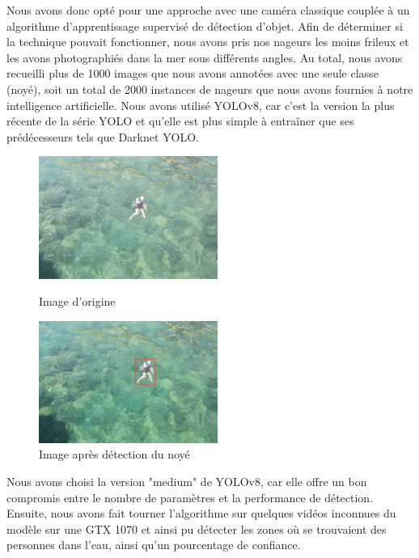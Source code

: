 \documentclass[a4paper,12pt,french]{report}
\begin{document}
Nous avons donc opté pour une approche avec une caméra classique couplée à un algorithme d'apprentissage supervisé de détection d'objet. Afin de déterminer si la technique pouvait fonctionner, nous avons pris nos nageurs les moins frileux et les avons photographiés dans la mer sous différents angles. Au total, nous avons recueilli plus de 1000 images que nous avons annotées avec une seule classe (noyé), soit un total de 2000 instances de nageurs que nous avons fournies à notre intelligence artificielle. Nous avons utilisé YOLOv8, car c'est la version la plus récente de la série YOLO et qu'elle est plus simple à entraîner que ses prédécesseurs tels que Darknet YOLO.
\bigskip
\begin{figure}[h]
    \begin{minipage}{0.5\textwidth}
        \centering
        \includegraphics[height=4cm]{figures/vid.png}
        \caption{Image d'origine}
        \label{image}
    \end{minipage}%
    \begin{minipage}{0.5\textwidth}
        \centering
        \includegraphics[height=4cm]{figures/det.png}
        \caption{Image après détection du noyé}
        \label{detect}
    \end{minipage}
\end{figure}

Nous avons choisi la version "medium" de YOLOv8, car elle offre un bon compromis entre le nombre de paramètres et la performance de détection. Ensuite, nous avons fait tourner l'algorithme sur quelques vidéos inconnues du modèle sur une GTX 1070 et ainsi pu détecter les zones où se trouvaient des personnes dans l'eau, ainsi qu'un pourcentage de confiance.\newline
\end{document}
